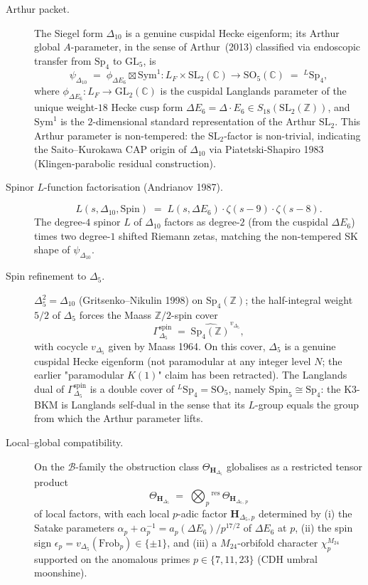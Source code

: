 \begin{description}
\item[Arthur packet.] The Siegel form $\Delta_{10}$ is a genuine
cuspidal Hecke eigenform; its Arthur global $A$-parameter, in the
sense of Arthur~(2013) classified via endoscopic transfer from
$\mathrm{Sp}_4$ to $\mathrm{GL}_5$, is
\[
 \psi_{\Delta_{10}}
 \;=\;
 \phi_{\Delta E_6} \boxtimes \mathrm{Sym}^1
 \colon
 L_F \times \mathrm{SL}_2(\mathbb{C})
 \longrightarrow
 \mathrm{SO}_5(\mathbb{C})
 \;=\;
 {}^L\mathrm{Sp}_4,
\]
where $\phi_{\Delta E_6}\colon L_F \to \mathrm{GL}_2(\mathbb{C})$ is
the cuspidal Langlands parameter of the unique weight-$18$ Hecke cusp
form $\Delta E_6 = \Delta\cdot E_6 \in S_{18}(\mathrm{SL}_2
(\mathbb{Z}))$, and $\mathrm{Sym}^1$ is the $2$-dimensional standard
representation of the Arthur $\mathrm{SL}_2$. This Arthur parameter is
non-tempered: the $\mathrm{SL}_2$-factor is non-trivial, indicating the
Saito--Kurokawa CAP origin of $\Delta_{10}$ via Piatetski-Shapiro
1983 (Klingen-parabolic residual construction).

\item[Spinor $L$-function factorisation (Andrianov 1987).]
\[
 L(s,\Delta_{10},\mathrm{Spin})
 \;=\;
 L(s,\Delta E_6)
 \cdot \zeta(s-9) \cdot \zeta(s-8).
\]
The degree-$4$ spinor $L$ of $\Delta_{10}$ factors as degree-$2$
(from the cuspidal $\Delta E_6$) times two degree-$1$ shifted Riemann
zetas, matching the non-tempered SK shape of $\psi_{\Delta_{10}}$.

\item[Spin refinement to $\Delta_5$.] $\Delta_5^2 = \Delta_{10}$
(Gritsenko--Nikulin 1998) on $\mathrm{Sp}_4(\mathbb{Z})$; the
half-integral weight $5/2$ of $\Delta_5$ forces the Maass
$\mathbb{Z}/2$-spin cover
\[
 \Gamma^{\mathrm{spin}}_{\Delta_5}
 \;=\;
 \widehat{\mathrm{Sp}_4(\mathbb{Z})}^{v_{\Delta_5}},
\]
with cocycle $v_{\Delta_5}$ given by Maass 1964. On this cover,
$\Delta_5$ is a genuine cuspidal Hecke eigenform (not paramodular at
any integer level $N$; the earlier "paramodular $K(1)$" claim has been
retracted). The Langlands dual of
$\Gamma^{\mathrm{spin}}_{\Delta_5}$ is a double cover of
${}^L\mathrm{Sp}_4 = \mathrm{SO}_5$, namely $\mathrm{Spin}_5 \cong
\mathrm{Sp}_4$: the K3-BKM is Langlands self-dual in the sense that its
$L$-group equals the group from which the Arthur parameter lifts.

\item[Local--global compatibility.] On the $\mathcal{B}$-family the
obstruction class $\Theta_{\mathbf{H}_{\Delta_5}}$ globalises as a
restricted tensor product
\[
 \Theta_{\mathbf{H}_{\Delta_5}}
 \;=\;
 \bigotimes_{p}{}^{\mathrm{res}}\,
 \Theta_{\mathbf{H}_{\Delta_5,\,p}}
\]
of local factors, with each local $p$-adic factor $\mathbf{H}_{\Delta_5,
p}$ determined by (i) the Satake parameters $\alpha_p + \alpha_p^{-1}
= a_p(\Delta E_6)/p^{17/2}$ of $\Delta E_6$ at $p$, (ii) the spin sign
$\epsilon_p = v_{\Delta_5}(\mathrm{Frob}_p) \in \{\pm 1\}$, and (iii) a
$M_{24}$-orbifold character $\chi^{M_{24}}_p$ supported on the
anomalous primes $p \in \{7, 11, 23\}$ (CDH umbral moonshine).


\end{description}
